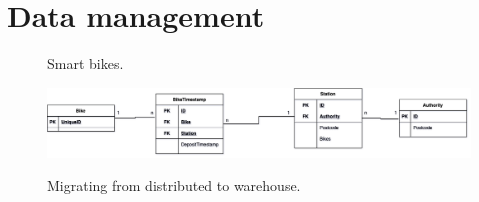 \documentclass[acmsmall, screen,timestamp,nonacm]{acmart}
\begin{document}
\section{Data management} %
\label{sec:data_management}
\begin{figure}
	\caption{Smart bikes.}
	\centering
	\def\svgwidth{\columnwidth}
	
	\label{fig:bikes}
\end{figure}
\begin{figure}
	\caption{Migrating from distributed to warehouse.}
	\centering
	\includegraphics[width=\columnwidth]{bikesdw.png}
	\label{fig:bikesdw}
\end{figure}
\end{document}
